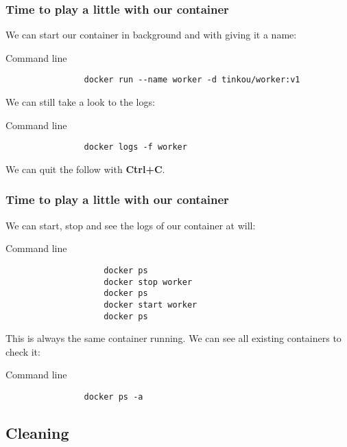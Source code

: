 	\begin{frame}[fragile]
		\frametitle{Time to play a little with our container}
		
		We can start our container in background and with giving it a name:
		\begin{block}{Command line}
			\begin{verbatim}
				docker run --name worker -d tinkou/worker:v1
			\end{verbatim}
		\end{block}
		
		\bigskip
		We can still take a look to the logs:
		\begin{block}{Command line}
			\begin{verbatim}
				docker logs -f worker
			\end{verbatim}
		\end{block}
		We can quit the follow with \textbf{Ctrl+C}.

	\end{frame}
	
	\begin{frame}[fragile]
		\frametitle{Time to play a little with our container}
		
		We can start, stop and see the logs of our container at will:
		\begin{block}{Command line}
			\begin{small}
				\begin{verbatim}
					docker ps
					docker stop worker
					docker ps
					docker start worker
					docker ps
				\end{verbatim}
			\end{small}
		\end{block}
		
		\bigskip
		This is always the same container running. We can see all existing containers to check it:
		\begin{block}{Command line}
			\begin{verbatim}
				docker ps -a
			\end{verbatim}
		\end{block}

	\end{frame}
	
\subsection{Cleaning}	
	
